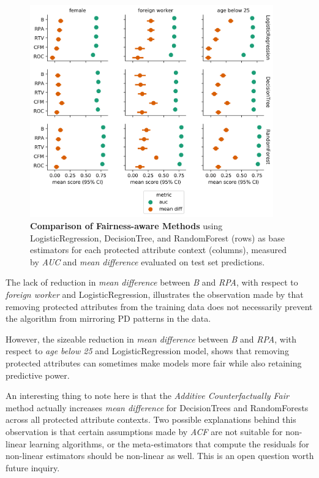 \documentclass{interact}
\begin{document}
\begin{figure}[h]
\centering
\includegraphics[width=10.5cm]{fairness_aware_comparison.png}
\caption{
  \textbf{Comparison of Fairness-aware Methods} using LogisticRegression,
  DecisionTree, and RandomForest (rows) as base estimators for each protected
  attribute context (columns), measured by \emph{AUC} and
  \emph{mean difference} evaluated on test set predictions.}
\label{figure-1-comparison-fa-methods}
\end{figure}

The lack of reduction in \emph{mean difference} between \emph{B} and \emph{RPA},
with respect to \emph{foreign worker} and LogisticRegression, illustrates the
observation made by \cite{kusner2017counterfactual} that removing protected
attributes from the training data does not necessarily prevent the algorithm
from mirroring PD patterns in the data.

However, the sizeable reduction in \emph{mean difference} between \emph{B} and
\emph{RPA}, with respect to \emph{age below 25} and LogisticRegression model,
shows that removing protected attributes can sometimes make models more fair
while also retaining predictive power.

An interesting thing to note here is that the \emph{Additive Counterfactually
Fair} method actually increases \emph{mean difference} for DecisionTrees and
RandomForests across all protected attribute contexts. Two possible explanations
behind this observation is that certain assumptions made by \emph{ACF} are not
suitable for non-linear learning algorithms, or the meta-estimators that compute
the residuals for non-linear estimators should be non-linear as well. This
is an open question worth future inquiry.
\end{document}
